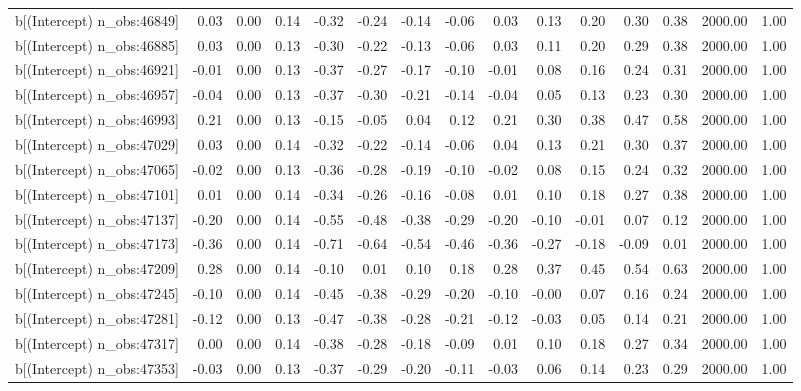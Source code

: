 \begin{table}[ht]
\begin{tabular}{rrrrrrrrrrrrrrr}
  b[(Intercept) n\_obs:46849] & 0.03 & 0.00 & 0.14 & -0.32 & -0.24 & -0.14 & -0.06 & 0.03 & 0.13 & 0.20 & 0.30 & 0.38 & 2000.00 & 1.00 \\ 
  b[(Intercept) n\_obs:46885] & 0.03 & 0.00 & 0.13 & -0.30 & -0.22 & -0.13 & -0.06 & 0.03 & 0.11 & 0.20 & 0.29 & 0.38 & 2000.00 & 1.00 \\ 
  b[(Intercept) n\_obs:46921] & -0.01 & 0.00 & 0.13 & -0.37 & -0.27 & -0.17 & -0.10 & -0.01 & 0.08 & 0.16 & 0.24 & 0.31 & 2000.00 & 1.00 \\ 
  b[(Intercept) n\_obs:46957] & -0.04 & 0.00 & 0.13 & -0.37 & -0.30 & -0.21 & -0.14 & -0.04 & 0.05 & 0.13 & 0.23 & 0.30 & 2000.00 & 1.00 \\ 
  b[(Intercept) n\_obs:46993] & 0.21 & 0.00 & 0.13 & -0.15 & -0.05 & 0.04 & 0.12 & 0.21 & 0.30 & 0.38 & 0.47 & 0.58 & 2000.00 & 1.00 \\ 
  b[(Intercept) n\_obs:47029] & 0.03 & 0.00 & 0.14 & -0.32 & -0.22 & -0.14 & -0.06 & 0.04 & 0.13 & 0.21 & 0.30 & 0.37 & 2000.00 & 1.00 \\ 
  b[(Intercept) n\_obs:47065] & -0.02 & 0.00 & 0.13 & -0.36 & -0.28 & -0.19 & -0.10 & -0.02 & 0.08 & 0.15 & 0.24 & 0.32 & 2000.00 & 1.00 \\ 
  b[(Intercept) n\_obs:47101] & 0.01 & 0.00 & 0.14 & -0.34 & -0.26 & -0.16 & -0.08 & 0.01 & 0.10 & 0.18 & 0.27 & 0.38 & 2000.00 & 1.00 \\ 
  b[(Intercept) n\_obs:47137] & -0.20 & 0.00 & 0.14 & -0.55 & -0.48 & -0.38 & -0.29 & -0.20 & -0.10 & -0.01 & 0.07 & 0.12 & 2000.00 & 1.00 \\ 
  b[(Intercept) n\_obs:47173] & -0.36 & 0.00 & 0.14 & -0.71 & -0.64 & -0.54 & -0.46 & -0.36 & -0.27 & -0.18 & -0.09 & 0.01 & 2000.00 & 1.00 \\ 
  b[(Intercept) n\_obs:47209] & 0.28 & 0.00 & 0.14 & -0.10 & 0.01 & 0.10 & 0.18 & 0.28 & 0.37 & 0.45 & 0.54 & 0.63 & 2000.00 & 1.00 \\ 
  b[(Intercept) n\_obs:47245] & -0.10 & 0.00 & 0.14 & -0.45 & -0.38 & -0.29 & -0.20 & -0.10 & -0.00 & 0.07 & 0.16 & 0.24 & 2000.00 & 1.00 \\ 
  b[(Intercept) n\_obs:47281] & -0.12 & 0.00 & 0.13 & -0.47 & -0.38 & -0.28 & -0.21 & -0.12 & -0.03 & 0.05 & 0.14 & 0.21 & 2000.00 & 1.00 \\ 
  b[(Intercept) n\_obs:47317] & 0.00 & 0.00 & 0.14 & -0.38 & -0.28 & -0.18 & -0.09 & 0.01 & 0.10 & 0.18 & 0.27 & 0.34 & 2000.00 & 1.00 \\ 
  b[(Intercept) n\_obs:47353] & -0.03 & 0.00 & 0.13 & -0.37 & -0.29 & -0.20 & -0.11 & -0.03 & 0.06 & 0.14 & 0.23 & 0.29 & 2000.00 & 1.00 \\ 

\end{tabular}
\end{table}
